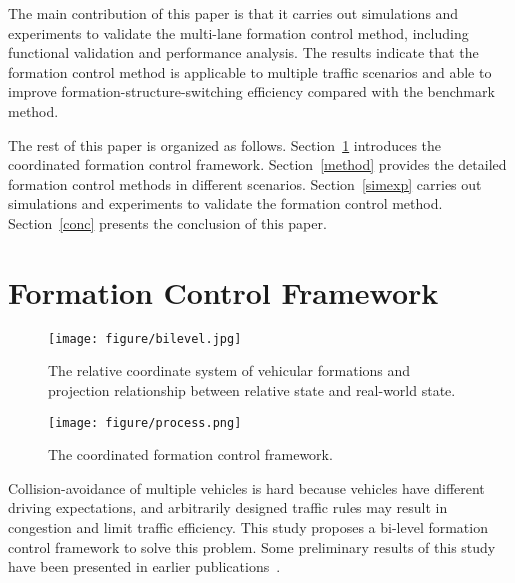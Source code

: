 \documentclass[journal]{IEEEtranTIE}
\begin{document}
The main contribution of this paper is that it carries out simulations and experiments to validate the multi-lane formation control method, including functional validation and performance analysis. The results indicate that the formation control method is applicable to multiple traffic scenarios and able to improve formation-structure-switching efficiency compared with the benchmark method.


The rest of this paper is organized as follows. Section~\ref{coord} introduces the coordinated formation control framework. Section~\ref{method} provides the detailed formation control methods in different scenarios. Section~\ref{simexp} carries out simulations and experiments to validate the formation control method. Section~\ref{conc} presents the conclusion of this paper.


%
\section{Formation Control Framework}
\label{coord}
%



\begin{figure}
\begin{center}
    \texttt{[image: figure/bilevel.jpg]}
    \caption{The relative coordinate system of vehicular formations and projection relationship between relative state and real-world state. }
    \label{bilevel}
\end{center}
\end{figure}

\begin{figure}
\begin{center}
    \texttt{[image: figure/process.png]}
    \caption{The coordinated formation control framework. }
    \label{process}
\end{center}
\end{figure}

Collision-avoidance of multiple vehicles is hard because vehicles have different driving expectations, and arbitrarily designed traffic rules may result in congestion and limit traffic efficiency. This study proposes a bi-level formation control framework to solve this problem. Some preliminary results of this study have been presented in earlier publications~\cite{cai2021formationa, cai2021formationb, cai2021formationc}.
\end{document}
